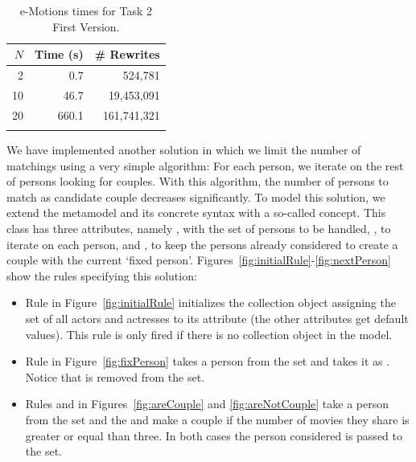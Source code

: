 \begin{table}[tb]
\renewcommand{\tabcolsep}{6pt}
\renewcommand{\arraystretch}{1.2}
    \centering
	\begin{tabular}[tb]{r|r|r|}
	$N$ & Time (s) & \# Rewrites \\
	\hline
	2 & 0.7 & 524,781 \\
	10 & 46.7 & 19,453,091 \\
	20 & 660.1 & 161,741,321 \\
	\hline \\
	\end{tabular}
	\caption{e-Motions times for Task 2 First Version.}\label{table:emotionstask1}
\end{table}

We have implemented another solution in which we limit the number of matchings using a very simple algorithm: For each person, we iterate on the rest of persons looking for couples.  
With this algorithm, the number of persons to match as candidate couple decreases significantly. To model this solution, we extend the metamodel and its concrete syntax with a so-called  concept. This class has three attributes, namely , with the set of persons to be handled, , to iterate on each person, and , to keep the persons already considered to create a couple with the current `fixed person'. Figures~\ref{fig:initialRule}-\ref{fig:nextPerson} show the rules specifying this solution: 
\begin{itemize}
\item
Rule  in Figure~\ref{fig:initialRule} initializes the collection object assigning the set of all actors and actresses to its  attribute (the other attributes get default values). This rule is only fired if there is no collection object in the model. 
\item
Rule  in Figure~\ref{fig:fixPerson} takes a person from the  set and takes it as . Notice that  is removed from the  set.
\item
Rules  and  in Figures~\ref{fig:areCouple} and \ref{fig:areNotCouple} take a person from the set  and the  and make a couple if the number of movies they share is greater or equal than three. In both cases the person considered is passed to the  set. 
\end{itemize}
